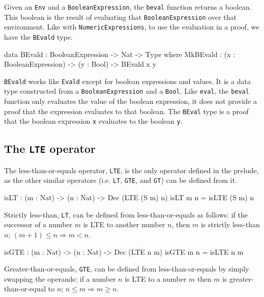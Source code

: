         Given an \texttt{Env} and a \texttt{BooleanExpression}, the \texttt{beval} function returns a boolean. This boolean is the result of evaluating that \texttt{BooleanExpression} over that environment. Like with \texttt{NumericExpressions}, to use the evaluation in a proof, we have the \texttt{BEvald} type.
        \begin{code}[caption={\texttt{BEvald} as defined in the \Idris model}]
data BEvald : BooleanExpression -> Nat -> Type where
    MkBEvald : (x : BooleanExpression) -> (y : Bool) -> BEvald x y
        \end{code}
        \texttt{BEvald} works like \texttt{Evald} except for boolean expressions and values. It is a data type constructed from a \texttt{BooleanExpression} and a \texttt{Bool}. Like \texttt{eval}, the \texttt{beval} function only evaluates the value of the boolean expression, it does not provide a proof that the expression evaluates to that boolean. The \texttt{BEval} type is a proof that the boolean expression \texttt{x} evaluates to the boolean \texttt{y}.
        
    \subsection{The \texttt{LTE} operator}\label{des:tp:lte}
        The less-than-or-equals operator, \texttt{LTE}, is the only operator defined in the \Idris prelude, as the other similar operators (i.e. \texttt{LT}, \texttt{GTE}, and \texttt{GT}) can be defined from it.
        
        \begin{code}[caption={\texttt{LT} can be defined based on \texttt{LTE}}]
        isLT : (m : Nat) -> (n : Nat) -> Dec (LTE (S m) n)
        isLT m n = isLTE (S m) n
        \end{code}
        
        Strictly less-than, \texttt{LT}, can be defined from less-than-or-equals as follows: if the successor of a number $m$ is LTE to another number $n$, then $m$ is strictly less-than $n$; $(m + 1) \leq n \Rightarrow m < n$.
        
        \begin{code}[caption={\texttt{GTE} can be defined based on \texttt{LTE}}]
        isGTE : (m : Nat) -> (n : Nat) -> Dec (LTE n m)
        isGTE m n = isLTE n m
        \end{code}
        
        Greater-than-or-equals, \texttt{GTE}, can be defined from less-than-or-equals by simply swapping the operands: if a number $n$ is LTE to a number $m$ then $m$ is greater-than-or-equal to $n$; $n \leq m \Rightarrow m \geq n$.
        
